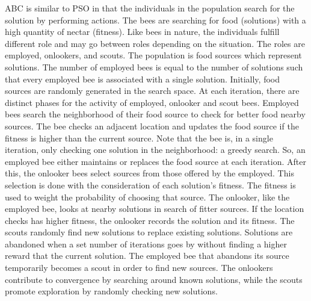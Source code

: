 \documentclass{tamuccthesis}
\begin{document}
ABC is similar to PSO in that the individuals in the population search for the solution by performing actions. The bees are searching for food (solutions) with a high quantity of nectar (fitness). Like bees in nature, the individuals fulfill different role and may go between roles depending on the situation. The roles are employed, onlookers, and scouts. The population is food sources which represent solutions. The number of employed bees is equal to the number of solutions such that every employed bee is associated with a single solution. Initially, food sources are randomly generated in the search space. At each iteration, there are distinct phases for the activity of employed, onlooker and scout bees. Employed bees search the neighborhood of their food source to check for better food nearby sources. The bee checks an adjacent location and updates the food source if the fitness is higher than the current source. Note that the bee is, in a single iteration, only checking one solution in the neighborhood: a greedy search. So, an employed bee either maintains or replaces the food source at each iteration. After this, the onlooker bees select sources from those offered by the employed. This selection is done with the consideration of each solution's fitness. The fitness is used to weight the probability of choosing that source. The onlooker, like the employed bee, looks at nearby solutions in search of fitter sources. If the location checks has higher fitness, the onlooker records the solution and its fitness. The scouts randomly find new solutions to replace existing solutions. Solutions are abandoned when a set number of iterations goes by without finding a higher reward that the current solution. The employed bee that abandons its source temporarily becomes a scout in order to find new sources. The onlookers contribute to convergence by searching around known solutions, while the scouts promote exploration by randomly checking new solutions. 
\end{document}
